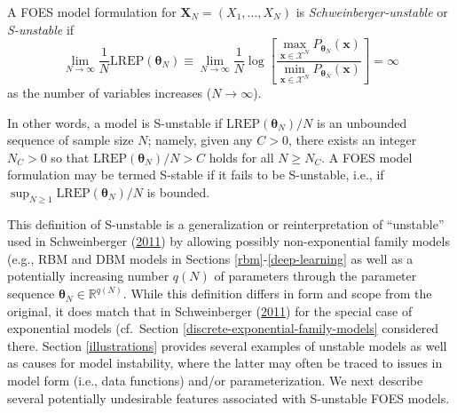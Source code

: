 \documentclass[]{article}
\theoremstyle{definition}
\newcommand{\REP}{\mathrm{LREP}}
\let\BeginKnitrBlock\begin \let\EndKnitrBlock\end
\begin{document}
\BeginKnitrBlock{definition}[S-unstable FOES model]
\protect\hypertarget{def:instabFSFS}{}{\label{def:instabFSFS}
\iffalse (S-unstable FOES model) \fi{} }A FOES model formulation for
\(\boldsymbol X_N=(X_1,\ldots,X_N)\) is \emph{Schweinberger-unstable} or
\emph{S-unstable} if
\begin{equation}
\label{eq:Sun}
\lim \limits_{N \rightarrow \infty} \frac{1}{N} \REP(\boldsymbol \theta_N) \equiv \lim \limits_{N \rightarrow \infty} \frac{1}{N}\log \left[\frac{\max\limits_{  \boldsymbol x\in \mathcal{X}^N}P_{\boldsymbol \theta_N}( \boldsymbol x)}{\min\limits_{ \boldsymbol x \in \mathcal{X}^N}P_{\boldsymbol \theta_N}( \boldsymbol x)}\right] = \infty
\end{equation}
as the number of variables increases (\(N \rightarrow \infty\)).
\EndKnitrBlock{definition} In other words, a model is S-unstable if
\(\REP(\boldsymbol \theta_N)/N\) is an unbounded sequence of sample size
\(N\); namely, given any \(C > 0\), there exists an integer \(N_C > 0\)
so that \(\REP(\boldsymbol \theta_N)/N > C\) holds for all
\(N \ge N_C\). A FOES model formulation may be termed S-stable if it
fails to be S-unstable, i.e., if
\(\sup_{N \geq 1}\REP(\boldsymbol \theta_N)/N\) is bounded.

This definition of S-unstable is a generalization or reinterpretation of
``unstable'' used in Schweinberger
(\protect\hyperlink{ref-schweinberger2011instability}{2011}) by allowing
possibly non-exponential family models (e.g., RBM and DBM models in
Sections \ref{rbm}-\ref{deep-learning} as well as a potentially
increasing number \(q(N)\) of parameters through the parameter sequence
\(\boldsymbol \theta_N\in \mathbb{R}^{q(N)}\). While this definition
differs in form and scope from the original, it does match that in
Schweinberger
(\protect\hyperlink{ref-schweinberger2011instability}{2011}) for the
special case of exponential models (cf.~Section
\ref{discrete-exponential-family-models} considered there. Section
\ref{illustrations} provides several examples of unstable models as well
as causes for model instability, where the latter may often be traced to
issues in model form (i.e., data functions) and/or parameterization. We
next describe several potentially undesirable features associated with
S-unstable FOES models.
\end{document}

